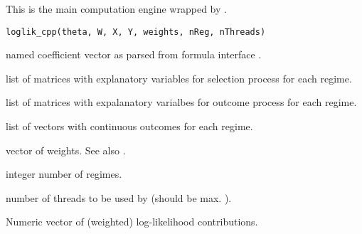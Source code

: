 \documentclass[letterpaper]{book}
\begin{document}
%
\begin{Examples}
\end{Examples}
%
\begin{Description}
This is the main computation engine wrapped by .
\end{Description}
%
\begin{Usage}
\begin{verbatim}
loglik_cpp(theta, W, X, Y, weights, nReg, nThreads)
\end{verbatim}
\end{Usage}
%
\begin{Arguments}
\begin{ldescription}
\item[\code{theta}] named coefficient vector as parsed from formula interface .

\item[\code{W}] list of matrices with explanatory variables for selection process for each regime.

\item[\code{X}] list of matrices with expalanatory varialbes for outcome process for each regime.

\item[\code{Y}] list of vectors with continuous outcomes for each regime.

\item[\code{weights}] vector of weights. See also .

\item[\code{nReg}] integer number of regimes.

\item[\code{nThreads}] number of threads to be used by  (should be max. ).
\end{ldescription}
\end{Arguments}
%
\begin{Value}
Numeric vector of (weighted) log-likelihood contributions.
\end{Value}
\end{document}
